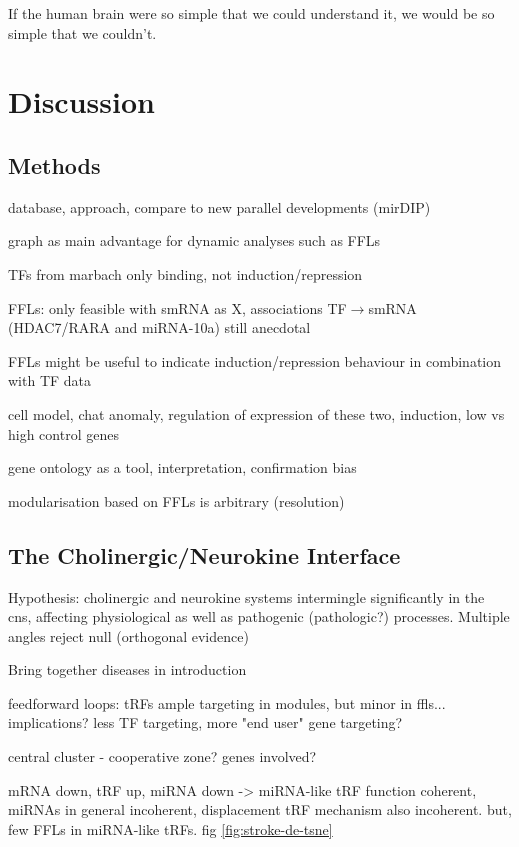 \begin{savequote}[75mm]
If the human brain were so simple that we could understand it, we would be so simple that we couldn’t.
\end{savequote}

\chapter{Discussion}
\section{Methods} \label{sec:discussion:methods}
database, approach, compare to new parallel developments (mirDIP)

graph as main advantage for dynamic analyses such as FFLs

TFs from marbach only binding, not induction/repression

FFLs: only feasible with smRNA as X, associations TF$\to$smRNA (HDAC7/RARA and miRNA-10a) still anecdotal 

FFLs might be useful to indicate induction/repression behaviour in combination with TF data

cell model, chat anomaly, regulation of expression of these two, induction, low vs high control genes

gene ontology as a tool, interpretation, confirmation bias

modularisation based on FFLs is arbitrary (resolution)

\section{The Cholinergic/Neurokine Interface}
Hypothesis: cholinergic and neurokine systems intermingle significantly in the cns, affecting physiological as well as pathogenic (pathologic?) processes. Multiple angles reject null (orthogonal evidence)

Bring together diseases in introduction

feedforward loops: tRFs ample targeting in modules, but minor in ffls... implications? less TF targeting, more "end user" gene targeting?

central cluster - cooperative zone? genes involved?

mRNA down, tRF up, miRNA down -> miRNA-like tRF function coherent, miRNAs in general incoherent, displacement tRF mechanism also incoherent. but, few FFLs in miRNA-like tRFs. fig \ref{fig:stroke-de-tsne}

